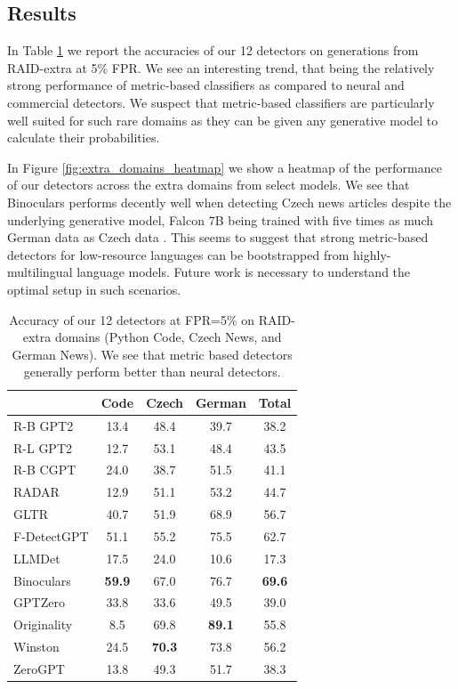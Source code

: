 \documentclass[11pt]{article}
\begin{document}
\subsection{Results}
In Table \ref{tab:raid_extra_results} we report the accuracies of our 12 detectors on generations from RAID-extra at 5\% FPR. We see an interesting trend, that being the relatively strong performance of metric-based classifiers as compared to neural and commercial detectors. We suspect that metric-based classifiers are particularly well suited for such rare domains as they can be given any generative model to calculate their probabilities.

In Figure \ref{fig:extra_domains_heatmap} we show a heatmap of the performance of our detectors across the extra domains from select models. We see that Binoculars performs decently well when detecting Czech news articles despite the underlying generative model, Falcon 7B \cite{almazrouei2023falcon} being trained with five times as much German data as Czech data \cite{penedo2023refinedweb}. This seems to suggest that strong metric-based detectors for low-resource languages can be bootstrapped from highly-multilingual language models. Future work is necessary to understand the optimal setup in such scenarios.

\begin{table}[t]
    \small
    \centering
    \begin{tabular}{l|c|c|c|c}
    \toprule
    &\textbf{Code}&\textbf{Czech}&\textbf{German}&\textbf{Total}\\
    \midrule
    R-B GPT2&13.4&48.4&39.7&38.2\\
    R-L GPT2&12.7&53.1&48.4&43.5\\
    R-B CGPT&24.0&38.7&51.5&41.1\\
    RADAR&12.9&51.1&53.2&44.7\\
    \midrule
    GLTR&40.7&51.9&68.9&56.7\\
    F-DetectGPT&51.1&55.2&75.5&62.7\\
    LLMDet&17.5&24.0&10.6&17.3\\
    Binoculars&\textbf{59.9}&67.0&76.7&\textbf{69.6}\\
    \midrule
    GPTZero&33.8&33.6&49.5&39.0\\
    Originality&8.5&69.8&\textbf{89.1}&55.8\\
    Winston&24.5&\textbf{70.3}&73.8&56.2\\
    ZeroGPT&13.8&49.3&51.7&38.3\\
    \bottomrule
    \end{tabular}
    \caption{Accuracy of our 12 detectors at FPR=5\% on RAID-extra domains (Python Code, Czech News, and German News). We see that metric based detectors generally perform better than neural detectors.}
    \label{tab:raid_extra_results}
\end{table}
\end{document}
